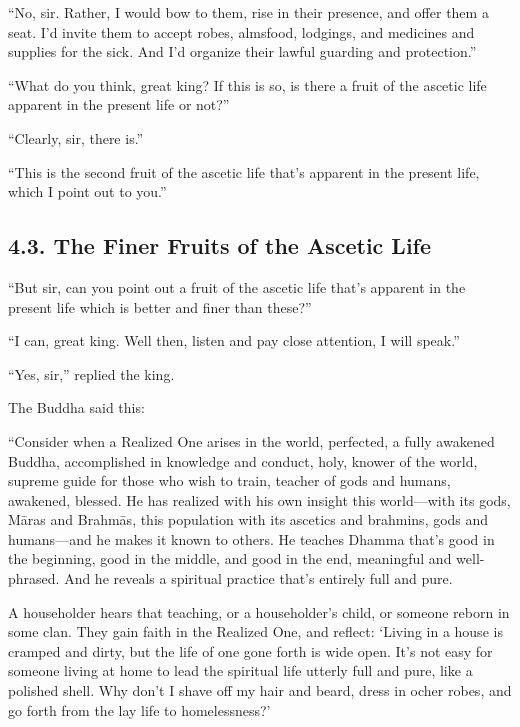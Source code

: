 \documentclass[12pt,openany]{book}%
\begin{document}
“No, sir. Rather, I would bow to them, rise in their presence, and offer them a seat. I’d invite them to accept robes, almsfood, lodgings, and medicines and supplies for the sick. And I’d organize their lawful guarding and protection.” 

“What do you think, great king? If this is so, is there a fruit of the ascetic life apparent in the present life or not?” 

“Clearly, sir, there is.” 

“This is the second fruit of the ascetic life that’s apparent in the present life, which I point out to you.” 

\subsection*{4.3. The Finer Fruits of the Ascetic Life }

“But sir, can you point out a fruit of the ascetic life that’s apparent in the present life which is better and finer than these?” 

“I can, great king. Well then, listen and pay close attention, I will speak.” 

“Yes, sir,” replied the king. 

The Buddha said this: 

“Consider when a Realized One arises in the world, perfected, a fully awakened Buddha, accomplished in knowledge and conduct, holy, knower of the world, supreme guide for those who wish to train, teacher of gods and humans, awakened, blessed. He has realized with his own insight this world—with its gods, \textsanskrit{Māras} and \textsanskrit{Brahmās}, this population with its ascetics and brahmins, gods and humans—and he makes it known to others. He teaches Dhamma that’s good in the beginning, good in the middle, and good in the end, meaningful and well-phrased. And he reveals a spiritual practice that’s entirely full and pure. 

A householder hears that teaching, or a householder’s child, or someone reborn in some clan. They gain faith in the Realized One, and reflect: ‘Living in a house is cramped and dirty, but the life of one gone forth is wide open. It’s not easy for someone living at home to lead the spiritual life utterly full and pure, like a polished shell. Why don’t I shave off my hair and beard, dress in ocher robes, and go forth from the lay life to homelessness?’ 
\end{document}

